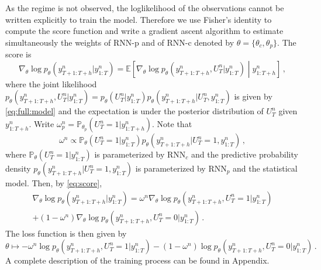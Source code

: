 \documentclass{article} %
\newcommand{\ts}{y}
\newcommand{\predictor}{\mathrm{RNN}_p}
\newcommand{\classifier}{\mathrm{RNN}_c}
\newcommand{\rnnparam}{\theta}
\begin{document}
As the regime is not observed, the loglikelihood of the observations cannot be written explicitly to train the model. Therefore we use Fisher's identity to compute the score function and write a gradient ascent algorithm to estimate simultaneously the weights of RNN-p and of RNN-c denoted by $\rnnparam = \{\rnnparam_c,\rnnparam_p\}$. The score is
\begin{equation}
\label{eq:score}
\nabla_\theta \log p_\theta(\ts^n_{T+1:T+h}|\ts^n_{1:T}) = \mathbb{E}\left[\nabla_\theta \log p_\theta(\ts^n_{T+1:T+h},U_T^n|\ts^n_{1:T})\middle|\ts^n_{1:T+h}\right]\,,
\end{equation}
where the joint likelihood $p_\theta(\ts^n_{T+1:T+h},U_T^n|\ts^n_{1:T}) = p_\theta(U_T^n|\ts^n_{1:T})p_\theta(\ts^n_{T+1:T+h}|U_T^n,\ts^n_{1:T})$ is given by \eqref{eq:full:model} and the expectation is under the posterior distribution of $U_T^n$ given $\ts^n_{1:T+h}$. Write $\omega_p^n = \mathbb{P}_{\theta_p}(U_T^n = 1|\ts^n_{1:T+h})$. Note that
$$
\omega^n \propto \mathbb{P}_{\theta}(U_T^n = 1|\ts^n_{1:T})p_{\theta}(\ts^n_{T+1:T+h}|U_T^n=1,\ts^n_{1:T})\,,
$$
where $ \mathbb{P}_{\theta}(U_T^n = 1|\ts^n_{1:T})$ is parameterized by $\classifier$ and the predictive probability density $p_{\theta}(\ts^n_{T+1:T+h}|U_T^n=1,\ts^n_{1:T})$ is parameterized by $\predictor$ and the statistical model.
Then, by \eqref{eq:score},
\begin{multline*}
\nabla_\theta \log p_\theta(\ts^n_{T+1:T+h}|\ts^n_{1:T}) = \omega^n\nabla_\theta \log p_\theta(\ts^n_{T+1:T+h},U_T^n=1|\ts^n_{1:T})\\
+ (1-\omega^n)\nabla_\theta \log p_\theta(\ts^n_{T+1:T+h},U_T^n=0|\ts^n_{1:T})\,.
\end{multline*}
The loss function is then given by
$$
\theta\mapsto - \omega^n \log p_\theta(\ts^n_{T+1:T+h},U_T^n=1|\ts^n_{1:T})- (1-\omega^n) \log p_\theta(\ts^n_{T+1:T+h},U_T^n=0|\ts^n_{1:T})\,.
$$
A complete description of the training process can be found in Appendix.
\end{document}
